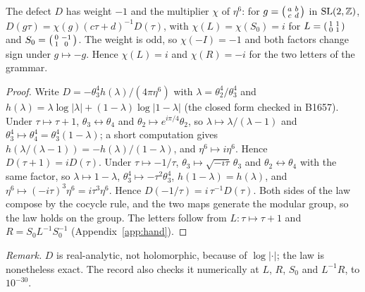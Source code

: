 \begin{lemma}\label{lem:automorphy}
The defect $D$ has weight $-1$ and the multiplier $\chi$ of $\eta^6$: for $g=\begin{psmallmatrix}a&b\\c&d\end{psmallmatrix}$
in $\mathrm{SL}(2,\mathbb{Z})$, $D(g\tau)=\chi(g)(c\tau+d)^{-1}D(\tau)$, with $\chi(L)=\chi(S_0)=i$ for
$L=\begin{psmallmatrix}1&1\\0&1\end{psmallmatrix}$ and $S_0=\begin{psmallmatrix}0&-1\\1&0\end{psmallmatrix}$. The weight is
odd, so $\chi(-I)=-1$ and both factors change sign under $g\mapsto-g$. Hence $\chi(L)=i$ and $\chi(R)=-i$ for the two
letters of the grammar.
\end{lemma}
\begin{proof}
Write $D=-\theta_3^4h(\lambda)/(4\pi\eta^6)$ with $\lambda=\theta_2^4/\theta_3^4$ and
$h(\lambda)=\lambda\log|\lambda|+(1-\lambda)\log|1-\lambda|$ (the closed form checked in B1657). Under $\tau\mapsto\tau+1$,
$\theta_3\leftrightarrow\theta_4$ and $\theta_2\mapsto e^{i\pi/4}\theta_2$, so $\lambda\mapsto\lambda/(\lambda-1)$ and
$\theta_3^4\mapsto\theta_4^4=\theta_3^4(1-\lambda)$; a short computation gives $h(\lambda/(\lambda-1))=-h(\lambda)/(1-\lambda)$, and
$\eta^6\mapsto i\eta^6$. Hence $D(\tau+1)=iD(\tau)$. Under $\tau\mapsto-1/\tau$, $\theta_3\mapsto\sqrt{-i\tau}\,\theta_3$ and
$\theta_2\leftrightarrow\theta_4$ with the same factor, so $\lambda\mapsto1-\lambda$, $\theta_3^4\mapsto-\tau^2\theta_3^4$,
$h(1-\lambda)=h(\lambda)$, and $\eta^6\mapsto(-i\tau)^3\eta^6=i\tau^3\eta^6$. Hence $D(-1/\tau)=i\,\tau^{-1}D(\tau)$. Both sides of the
law compose by the cocycle rule, and the two maps generate the modular group, so the law holds on the group. The letters
follow from $L:\tau\mapsto\tau+1$ and $R=S_0L^{-1}S_0^{-1}$ (Appendix~\ref{app:hand}).
\end{proof}
\noindent\emph{Remark.} $D$ is real-analytic, not holomorphic, because of $\log|\cdot|$; the law is nonetheless exact. The
record also checks it numerically at $L$, $R$, $S_0$ and $L^{-1}R$, to $10^{-30}$.

